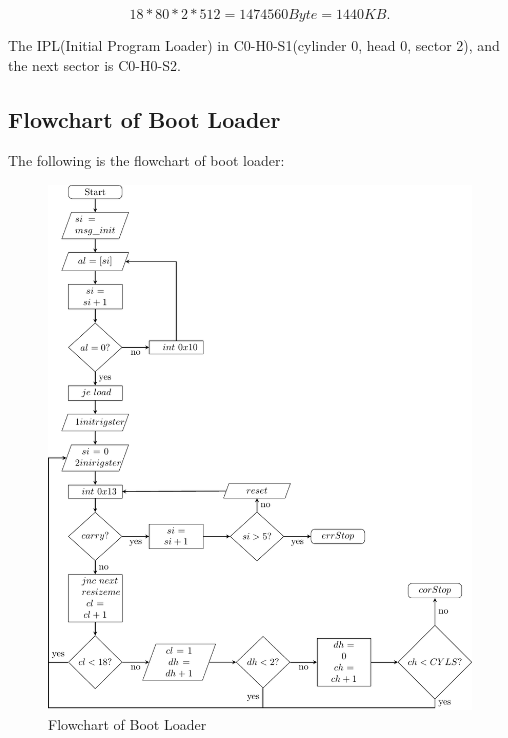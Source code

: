 \documentclass{swfcthesisp}
\begin{document}
$$18 * 80 * 2 * 512 = 1474560 Byte = 1440 KB.$$

The IPL(Initial Program Loader) in C0-H0-S1(cylinder 0, head 0, sector 2), and the next
sector is C0-H0-S2.


\subsection{Flowchart of Boot Loader}
The following is the flowchart of boot loader:
\label{sec:flowch-boot-load}
\begin{figure}[!ht]
  \centering
  \includegraphics[width=1\textwidth]{../figs/FlowchartTex/1/flowchartp.pdf}
  \caption{Flowchart of Boot Loader}
  \label{fig:flowchart-of-boot-loader}
\end{figure}
\end{document}
